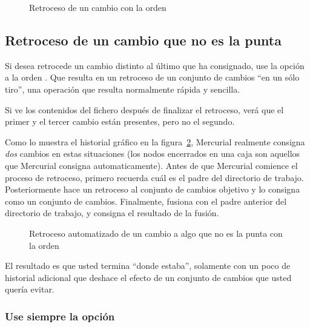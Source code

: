 \begin{figure}[htb]
  \centering
  \caption{Retroceso de un cambio con la orden }
  \label{fig:undo:backout}
\end{figure}

\subsection{Retroceso de un cambio que no es la punta}

Si desea retrocede un cambio distinto al último que ha consignado, use
la opción  a la orden .
Que resulta en un retroceso de un conjunto de cambios ``en un sólo
tiro'', una operación que resulta normalmente rápida y sencilla.

Si ve los contenidos del fichero  después de
finalizar el retroceso, verá que el primer y el tercer cambio están
presentes, pero no el segundo.

Como lo muestra el historial gráfico en la
figura~\ref{fig:undo:backout-non-tip}, Mercurial realmente consigna
\emph{dos} cambios en estas situaciones (los nodos encerrados en una
caja son aquellos que Mercurial consigna automaticamente).  Antes de
que Mercurial comience el proceso de retroceso, primero recuerda cuál
es el padre del directorio de trabajo.  Posteriormente hace un
retroceso al conjunto de cambios objetivo y lo consigna como un
conjunto de cambios. Finalmente, fusiona con el padre anterior del
directorio de trabajo, y consigna el resultado de la fusión.


\begin{figure}[htb]
  \centering
  \caption{Retroceso automatizado de un cambio a algo que no es la punta con la orden }
  \label{fig:undo:backout-non-tip}
\end{figure}

El resultado es que usted termina ``donde estaba'', solamente con un
poco de historial adicional que deshace el efecto de un conjunto de
cambios que usted quería evitar.

\subsubsection{Use siempre la opción }

